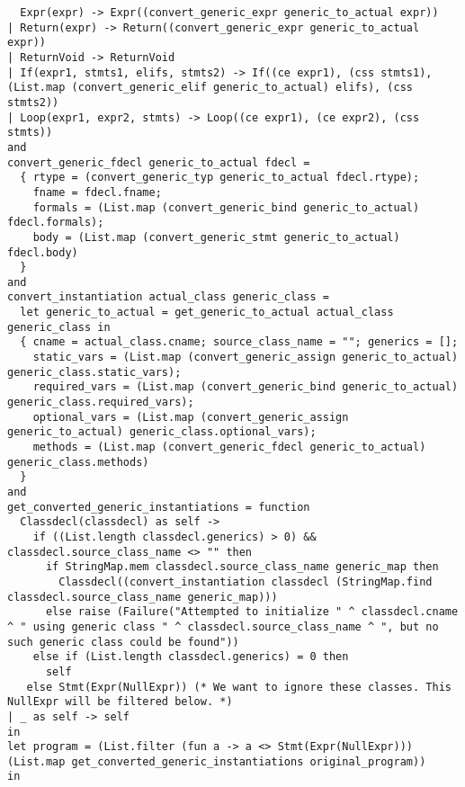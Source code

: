 \documentclass{article}
\begin{document}
\begin{verbatim}
  Expr(expr) -> Expr((convert_generic_expr generic_to_actual expr))
| Return(expr) -> Return((convert_generic_expr generic_to_actual expr))
| ReturnVoid -> ReturnVoid
| If(expr1, stmts1, elifs, stmts2) -> If((ce expr1), (css stmts1), (List.map (convert_generic_elif generic_to_actual) elifs), (css stmts2))
| Loop(expr1, expr2, stmts) -> Loop((ce expr1), (ce expr2), (css stmts))
and
convert_generic_fdecl generic_to_actual fdecl =
  { rtype = (convert_generic_typ generic_to_actual fdecl.rtype);
    fname = fdecl.fname;
    formals = (List.map (convert_generic_bind generic_to_actual) fdecl.formals);
    body = (List.map (convert_generic_stmt generic_to_actual) fdecl.body)
  }
and
convert_instantiation actual_class generic_class =
  let generic_to_actual = get_generic_to_actual actual_class generic_class in
  { cname = actual_class.cname; source_class_name = ""; generics = [];
    static_vars = (List.map (convert_generic_assign generic_to_actual) generic_class.static_vars);
    required_vars = (List.map (convert_generic_bind generic_to_actual) generic_class.required_vars);
    optional_vars = (List.map (convert_generic_assign generic_to_actual) generic_class.optional_vars);
    methods = (List.map (convert_generic_fdecl generic_to_actual) generic_class.methods)
  }
and
get_converted_generic_instantiations = function
  Classdecl(classdecl) as self ->
    if ((List.length classdecl.generics) > 0) && classdecl.source_class_name <> "" then
      if StringMap.mem classdecl.source_class_name generic_map then
        Classdecl((convert_instantiation classdecl (StringMap.find classdecl.source_class_name generic_map)))
      else raise (Failure("Attempted to initialize " ^ classdecl.cname ^ " using generic class " ^ classdecl.source_class_name ^ ", but no such generic class could be found"))
    else if (List.length classdecl.generics) = 0 then
      self
   else Stmt(Expr(NullExpr)) (* We want to ignore these classes. This NullExpr will be filtered below. *)
| _ as self -> self
in
let program = (List.filter (fun a -> a <> Stmt(Expr(NullExpr))) (List.map get_converted_generic_instantiations original_program))
in


\end{verbatim}
\end{document}
